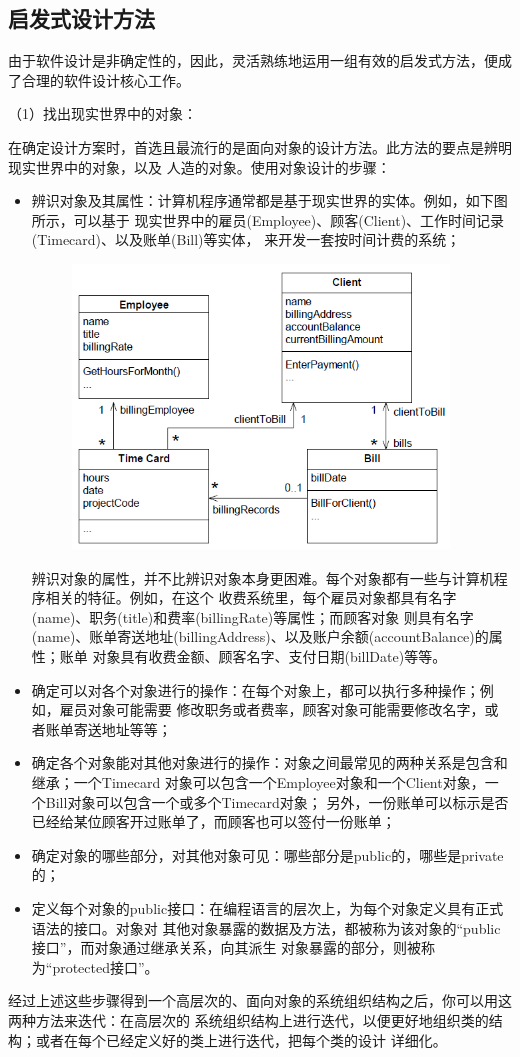 \documentclass{article}
\begin{document}
\subsection{启发式设计方法}
由于软件设计是非确定性的，因此，灵活熟练地运用一组有效的启发式方法，便成了合理的软件设计核心工作。
\par
（1）找出现实世界中的对象：
\par
在确定设计方案时，首选且最流行的是面向对象的设计方法。此方法的要点是辨明现实世界中的对象，以及
人造的对象。使用对象设计的步骤：
\begin{itemize}
    \item 辨识对象及其属性：计算机程序通常都是基于现实世界的实体。例如，如下图所示，可以基于
    现实世界中的雇员(Employee)、顾客(Client)、工作时间记录(Timecard)、以及账单(Bill)等实体，
    来开发一套按时间计费的系统；
    \begin{figure}[ht]
        \centering
        \includegraphics[width=10cm]{figure5.png}
    \end{figure}
    辨识对象的属性，并不比辨识对象本身更困难。每个对象都有一些与计算机程序相关的特征。例如，在这个
    收费系统里，每个雇员对象都具有名字(name)、职务(title)和费率(billingRate)等属性；而顾客对象
    则具有名字(name)、账单寄送地址(billingAddress)、以及账户余额(accountBalance)的属性；账单
    对象具有收费金额、顾客名字、支付日期(billDate)等等。
    \item 确定可以对各个对象进行的操作：在每个对象上，都可以执行多种操作；例如，雇员对象可能需要
    修改职务或者费率，顾客对象可能需要修改名字，或者账单寄送地址等等；
    \item 确定各个对象能对其他对象进行的操作：对象之间最常见的两种关系是包含和继承；一个Timecard
    对象可以包含一个Employee对象和一个Client对象，一个Bill对象可以包含一个或多个Timecard对象；
    另外，一份账单可以标示是否已经给某位顾客开过账单了，而顾客也可以签付一份账单；
    \item 确定对象的哪些部分，对其他对象可见：哪些部分是public的，哪些是private的；
    \item 定义每个对象的public接口：在编程语言的层次上，为每个对象定义具有正式语法的接口。对象对
    其他对象暴露的数据及方法，都被称为该对象的“public接口”，而对象通过继承关系，向其派生
    对象暴露的部分，则被称为“protected接口”。
\end{itemize}
经过上述这些步骤得到一个高层次的、面向对象的系统组织结构之后，你可以用这两种方法来迭代：在高层次的
系统组织结构上进行迭代，以便更好地组织类的结构；或者在每个已经定义好的类上进行迭代，把每个类的设计
详细化。
\end{document}
